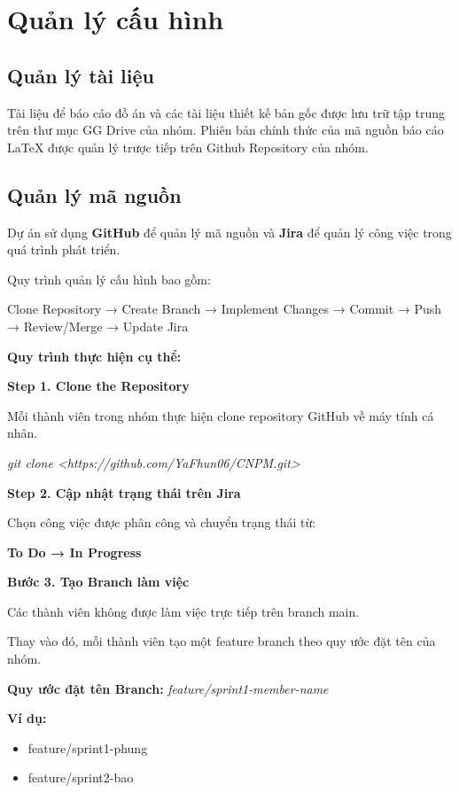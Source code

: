 \section{Quản lý cấu hình}

\subsection{Quản lý tài liệu}

Tài liệu để báo cáo đồ án và các tài liệu thiết kế bản gốc được lưu trữ tập trung trên thư mục GG Drive của nhóm. Phiên bản chính thức của mã nguồn báo cáo LaTeX được quản lý trược tiếp trên Github Repository của nhóm.

\subsection{Quản lý mã nguồn}

Dự án sử dụng \textbf{GitHub} để quản lý mã nguồn và \textbf{Jira} để quản lý công việc trong quá trình phát triển.

Quy trình quản lý cấu hình bao gồm:

Clone Repository → Create Branch → Implement Changes → Commit → Push → Review/Merge → Update Jira

\textbf{Quy trình thực hiện cụ thể:}

\textbf{Step 1. Clone the Repository}

Mỗi thành viên trong nhóm thực hiện clone repository GitHub về máy tính cá nhân.

\emph{git clone \textless https://github.com/YaFhun06/CNPM.git\textgreater{}}

\textbf{Step 2. Cập nhật trạng thái trên Jira}

Chọn công việc được phân công và chuyển trạng thái từ:

\textbf{To Do → In Progress}

\textbf{Bước 3. Tạo Branch làm việc}

Các thành viên không được làm việc trực tiếp trên branch main.

Thay vào đó, mỗi thành viên tạo một feature branch theo quy ước đặt tên của nhóm.

\textbf{Quy ước đặt tên Branch:} \emph{feature/sprint1-member-name}

\textbf{Ví dụ:}

\begin{itemize}
\item
  feature/sprint1-phung
\item
  feature/sprint2-bao
\end{itemize}

